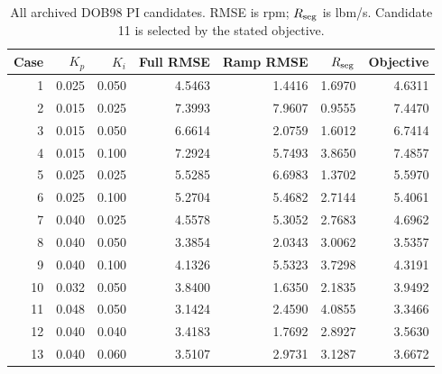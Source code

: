 \begin{table}[htbp]\centering\small\begin{tabular}{rrrrrrr}\toprule Case & $K_p$ & $K_i$ & Full RMSE & Ramp RMSE & $R_{\rm seg}$ & Objective\\\midrule
1 & 0.025 & 0.050 & 4.5463 & 1.4416 & 1.6970 & 4.6311\\
2 & 0.015 & 0.025 & 7.3993 & 7.9607 & 0.9555 & 7.4470\\
3 & 0.015 & 0.050 & 6.6614 & 2.0759 & 1.6012 & 6.7414\\
4 & 0.015 & 0.100 & 7.2924 & 5.7493 & 3.8650 & 7.4857\\
5 & 0.025 & 0.025 & 5.5285 & 6.6983 & 1.3702 & 5.5970\\
6 & 0.025 & 0.100 & 5.2704 & 5.4682 & 2.7144 & 5.4061\\
7 & 0.040 & 0.025 & 4.5578 & 5.3052 & 2.7683 & 4.6962\\
8 & 0.040 & 0.050 & 3.3854 & 2.0343 & 3.0062 & 3.5357\\
9 & 0.040 & 0.100 & 4.1326 & 5.5323 & 3.7298 & 4.3191\\
10 & 0.032 & 0.050 & 3.8400 & 1.6350 & 2.1835 & 3.9492\\
11 & 0.048 & 0.050 & 3.1424 & 2.4590 & 4.0855 & 3.3466\\
12 & 0.040 & 0.040 & 3.4183 & 1.7692 & 2.8927 & 3.5630\\
13 & 0.040 & 0.060 & 3.5107 & 2.9731 & 3.1287 & 3.6672\\
\bottomrule\end{tabular}\caption{All archived DOB98 PI candidates. RMSE is rpm; $R_{\rm seg}$ is lbm/s. Candidate 11 is selected by the stated objective.}\end{table}